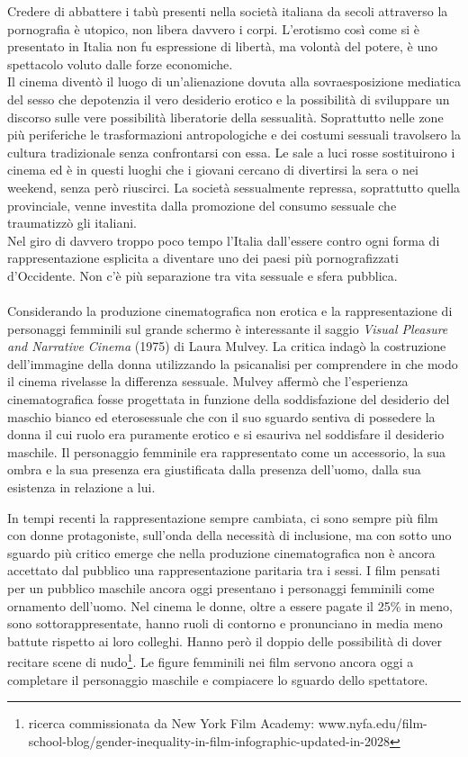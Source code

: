 Credere di abbattere i tabù presenti nella società italiana da secoli attraverso la pornografia è utopico, non libera davvero i corpi.
L'erotismo così come si è presentato in Italia non fu espressione di libertà, ma volontà del potere, è uno spettacolo voluto dalle forze economiche.
\\Il cinema diventò il luogo di un'alienazione dovuta alla sovraesposizione mediatica del sesso che depotenzia il vero desiderio erotico e la possibilità di sviluppare un discorso sulle vere possibilità liberatorie della sessualità.
Soprattutto nelle zone più periferiche le trasformazioni antropologiche e dei costumi sessuali travolsero la cultura tradizionale senza confrontarsi con essa.
Le sale a luci rosse sostituirono i cinema ed è in questi luoghi che i giovani cercano di divertirsi la sera o nei weekend, senza però riuscirci.
La società sessualmente repressa, soprattutto quella provinciale, venne investita dalla promozione del consumo sessuale che traumatizzò gli italiani.
\\Nel giro di davvero troppo poco tempo l'Italia dall'essere contro ogni forma di rappresentazione esplicita a diventare uno dei paesi più pornografizzati d'Occidente.
Non c'è più separazione tra vita sessuale e sfera pubblica.

\paragraph{}Considerando la produzione cinematografica non erotica e la rappresentazione di personaggi femminili sul grande schermo è interessante il saggio \textit{Visual Pleasure and Narrative Cinema} (1975) di Laura Mulvey.
La critica indagò la costruzione dell'immagine della donna utilizzando la psicanalisi per comprendere in che modo il cinema rivelasse la differenza sessuale.
Mulvey affermò che l'esperienza cinematografica fosse progettata in funzione della soddisfazione del desiderio del maschio bianco ed eterosessuale che con il suo sguardo sentiva di possedere la donna il cui ruolo era puramente erotico e si esauriva nel soddisfare il desiderio maschile.
Il personaggio femminile era rappresentato come un accessorio, la sua ombra e la sua presenza era giustificata dalla presenza dell'uomo, dalla sua esistenza in relazione a lui.

In tempi recenti la rappresentazione sempre cambiata, ci sono sempre più film con donne protagoniste, sull'onda della necessità di inclusione, ma con sotto uno sguardo più critico emerge che nella produzione cinematografica non è ancora accettato dal pubblico una rappresentazione paritaria tra i sessi.
I film pensati per un pubblico maschile ancora oggi presentano i personaggi femminili come ornamento dell'uomo.
Nel cinema le donne, oltre a essere pagate il 25\% in meno, sono sottorappresentate, hanno ruoli di contorno e pronunciano in media meno battute rispetto ai loro colleghi.
Hanno però il doppio delle possibilità di dover recitare scene di nudo\footnote{ricerca commissionata da New York Film Academy: www.nyfa.edu/film-school-blog/gender-inequality-in-film-infographic-updated-in-2028}.
Le figure femminili nei film servono ancora oggi a completare il personaggio maschile e compiacere lo sguardo dello spettatore.

